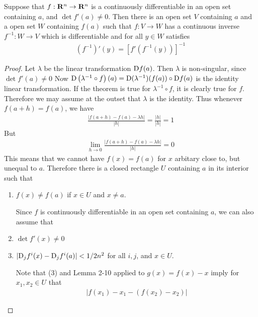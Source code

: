 \begin{theorem}
    Suppose that $f:\mathbf{R}^n\to \mathbf{R}^n$ is a continuously differentiable in an open set 
    containing $a$, and $\det f'(a)\neq 0$. Then there is an open set $V$ containing $a$ and 
    a open set $W$ containing $f(a)$ such that $f:V\to W$ has a continuous inverse $f^{-1}:W\to V$ which 
    is differentiable and for all $y\in W$ satisfies 
    \begin{align*}
        (f^{-1})'(y) = \left[f'\left(f^{-1}(y)\right)\right]^{-1}
    \end{align*}
\end{theorem}

\begin{proof}
    Let $\lambda$ be the linear transformation $\mathrm{D}f(a)$. Then $\lambda$ is non-singular,
    since $\det f'(a)\neq 0$ Now $\mathrm{D}\left(\lambda^{-1}\circ f\right)(a) = \mathrm{D}(\lambda^{-1})(f(a))\circ \mathrm{D}f(a)$
    is the identity linear transformation. If the theorem is true for $\lambda^{-1}\circ f$, it is 
    clearly true for $f$. Therefore we may assume at the outset that $\lambda$ is the identity. 
    Thus whenever $f(a+h) = f(a)$, we have 
    \begin{align*}
        \frac{\left|f(a+h) - f(a) - \lambda h\right|}{|h|}
        = \frac{|h|}{|h|}
        = 1
    \end{align*}
    But 
    \begin{align*}
        \lim_{h\to 0}{\frac{\left|f(a+h) - f(a) - \lambda h\right|}{|h|}}
        = 0
    \end{align*}
    This means that we cannot have $f(x)=f(a)$ for $x$ arbitary close to, but unequal to $a$.
    Therefore there is a closed rectangle $U$ containing $a$ in its interior such that 
    \begin{enumerate}[label={\upshape(\arabic*)}]
        \item $f(x)\neq f(a)$ if $x\in U$ and $x\neq a$.\par 
            Since $f$ is continuously differentiable in 
            an open set containing $a$, we can also assume that
        \item $\det f'(x)\neq 0$ 
        \item $|\mathrm{D}_jf^i(x) - \mathrm{D}_jf^i(a)| < 1/2n^2$ for all $i, j$, and $x\in U$.\par 
            Note that (3) and Lemma 2-10 applied to $g(x)=f(x) - x$ imply for $x_1, x_2\in U$ that 
            \begin{align*}
                \left|f(x_1) - x_1 -\left(f(x_2) - x_2\right)\right| 

\end{align*}
\end{enumerate}
\end{proof}
